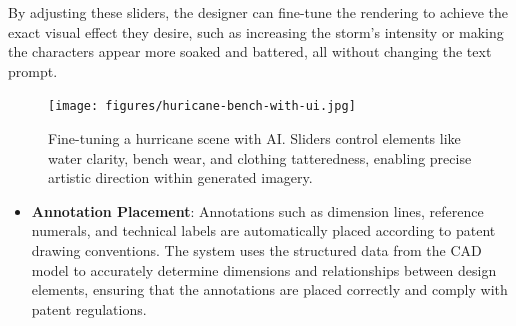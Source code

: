 \documentclass[12pt]{article}
\begin{document}
By adjusting these sliders, the designer can fine-tune the rendering to achieve the exact visual effect they desire, such as increasing the storm's intensity or making the characters appear more soaked and battered, all without changing the text prompt.

\begin{figure}[H]
    \centering
    \texttt{[image: figures/huricane-bench-with-ui.jpg]}
    \caption{Fine-tuning a hurricane scene with AI. Sliders control elements like water clarity, bench wear, and clothing tatteredness, enabling precise artistic direction within generated imagery.}
    \label{fig:modular-ui-texture-style}
\end{figure}










\begin{itemize}


\item \textbf{Annotation Placement}: Annotations such as dimension lines, reference numerals, and technical labels are automatically placed according to patent drawing conventions. The system uses the structured data from the CAD model to accurately determine dimensions and relationships between design elements, ensuring that the annotations are placed correctly and comply with patent regulations.

\end{itemize}
\end{document}

